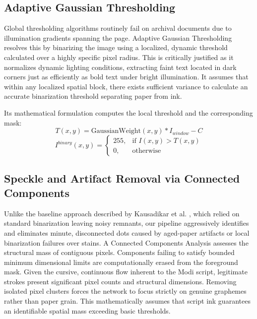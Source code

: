 \documentclass[journal, onecolumn]{IEEEtran}
\begin{document}
\subsection{Adaptive Gaussian Thresholding}
Global thresholding algorithms routinely fail on archival documents due to illumination gradients spanning the page. Adaptive Gaussian Thresholding \cite{bradley2007} resolves this by binarizing the image using a localized, dynamic threshold calculated over a highly specific pixel radius. This is critically justified as it normalizes dynamic lighting conditions, extracting faint text located in dark corners just as efficiently as bold text under bright illumination. It assumes that within any localized spatial block, there exists sufficient variance to calculate an accurate binarization threshold separating paper from ink.

Its mathematical formulation computes the local threshold and the corresponding mask:
\begin{equation}
T(x, y) = \text{GaussianWeight}(x, y) * I_{window} - C
\end{equation}
\begin{equation}
I^{binary}(x, y) = \begin{cases} 255, & \text{if } I(x, y) > T(x, y) \\ 0, & \text{otherwise} \end{cases}
\end{equation}

\subsection{Speckle and Artifact Removal via Connected Components}
Unlike the baseline approach described by Kausadikar et al. \cite{kausadikar2026}, which relied on standard binarization leaving noisy remnants, our pipeline aggressively identifies and eliminates minute, disconnected dots caused by aged-paper artifacts or local binarization failures over stains. A Connected Components Analysis assesses the structural mass of contiguous pixels. Components failing to satisfy bounded minimum dimensional limits are computationally erased from the foreground mask. Given the cursive, continuous flow inherent to the Modi script, legitimate strokes present significant pixel counts and structural dimensions. Removing isolated pixel clusters forces the network to focus strictly on genuine graphemes rather than paper grain. This mathematically assumes that script ink guarantees an identifiable spatial mass exceeding basic thresholds.
\end{document}
